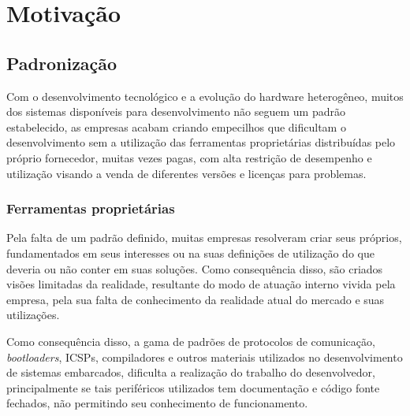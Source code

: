 \iffalse
O intuito deste trabalho é a realização de um sistema para possibilitar aos desenvolvedores a programação de sistemas embarcados, sem a necessidade de utilizar sistemas assistencialistas que possam limitar a evolução do trabalho ou a utilização do produto final concebido.
\fi

\section{Motivação}

\subsection{Padronização}
Com o desenvolvimento tecnológico e a evolução do hardware heterogêneo, muitos dos sistemas disponíveis para desenvolvimento não seguem um padrão estabelecido, as empresas acabam criando empecilhos que dificultam o desenvolvimento sem a utilização das ferramentas proprietárias distribuídas pelo próprio fornecedor, muitas vezes pagas, com alta restrição de desempenho e utilização visando a venda de diferentes versões e licenças para problemas.

\subsubsection{Ferramentas proprietárias}
Pela falta de um padrão definido, muitas empresas resolveram criar seus próprios, fundamentados em seus interesses ou na suas definições de utilização do que deveria ou não conter em suas soluções. Como consequência disso, são criados visões limitadas da realidade, resultante do modo de atuação interno vivida pela empresa, pela sua falta de conhecimento da realidade atual do mercado e suas utilizações.

Como consequência disso, a gama de padrões de protocolos de comunicação, \textit{bootloaders}, ICSPs, compiladores e outros materiais utilizados no desenvolvimento de sistemas embarcados, dificulta a realização do trabalho do desenvolvedor, principalmente se tais periféricos utilizados tem documentação e código fonte fechados, não permitindo seu conhecimento de funcionamento.



